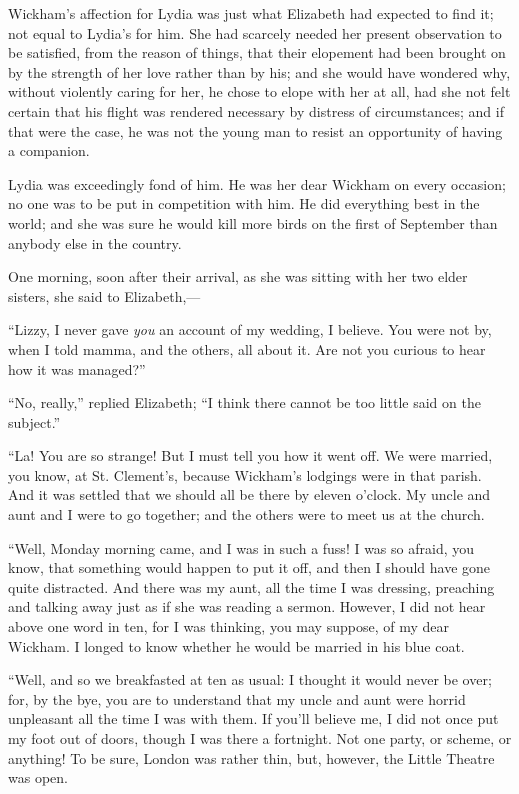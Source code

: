 \documentclass[12pt]{book}
\begin{document}
Wickham's affection for Lydia was just what Elizabeth had expected to find it; not equal to Lydia's for him. She had scarcely needed her present observation to be satisfied, from the reason of things, that their elopement had been brought on by the strength of her love rather than by his; and she would have wondered why, without violently caring for her, he chose to elope with her at all, had she not felt certain that his flight was rendered necessary by distress of circumstances; and if that were the case, he was not the young man to resist an opportunity of having a companion.

Lydia was exceedingly fond of him. He was her dear Wickham on every occasion; no one was to be put in competition with him. He did everything best in the world; and she was sure he would kill more birds on the first of September than anybody else in the country.

One morning, soon after their arrival, as she was sitting with her two elder sisters, she said to Elizabeth,---

``Lizzy, I never gave \textit{you} an account of my wedding, I believe. You were not by, when I told mamma, and the others, all about it. Are not you curious to hear how it was managed?''

``No, really,'' replied Elizabeth; ``I think there cannot be too little said on the subject.''

``La! You are so strange! But I must tell you how it went off. We were married, you know, at St. Clement's, because Wickham's lodgings were in that parish. And it was settled that we should all be there by eleven o'clock. My uncle and aunt and I were to go together; and the others were to meet us at the church.

``Well, Monday morning came, and I was in such a fuss! I was so afraid, you know, that something would happen to put it off, and then I should have gone quite distracted. And there was my aunt, all the time I was dressing, preaching and talking away just as if she was reading a sermon. However, I did not hear above one word in ten, for I was thinking, you may suppose, of my dear Wickham. I longed to know whether he would be married in his blue coat.

``Well, and so we breakfasted at ten as usual: I thought it would never be over; for, by the bye, you are to understand that my uncle and aunt were horrid unpleasant all the time I was with them. If you'll believe me, I did not once put my foot out of doors, though I was there a fortnight. Not one party, or scheme, or anything! To be sure, London was rather thin, but, however, the Little Theatre was open.
\end{document}
